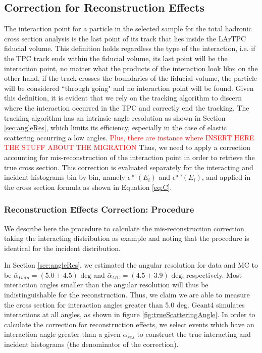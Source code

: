 \subsection{Correction for Reconstruction Effects}\label{ch:EFFXS}
The interaction point for a particle in the selected sample for the total hadronic cross section analysis is the last point of its track that lies inside the LArTPC fiducial volume. This definition holds regardless the type of the interaction, i.e. if the TPC track ends within the fiducial volume, its last point will be the interaction point, no matter what the products of the interaction look like; on the other hand, if the track crosses the boundaries of the fiducial volume, the particle will be considered ``through going" and no interaction point will be found.  Given this definition, it is evident that we rely on the tracking algorithm to discern where the interaction occurred in the TPC  and correctly end the tracking. The tracking algorithm has an intrinsic angle resolution as shown in Section \ref{sec:angleRes}, which limits its efficiency, especially in the case of elastic scattering occurring a low angles. \textcolor{red}{Plus, there are instance where INSERT HERE THE STUFF ABOUT THE MIGRATION}
Thus, we need to apply a correction accounting for mis-reconstruction of the interaction point in order to retrieve the true cross section.  This correction is evaluated separately for the interacting and incident histograms bin by bin, namely $\epsilon^{\text{int}}(E_i)$ and  $\epsilon^{\text{inc}}(E_i)$, and applied in the cross section formula as shown in  Equation \ref{eq:C}. 

\subsubsection{Reconstruction Effects Correction: Procedure}\label{sec:EffCorrection}
We describe here the procedure to calculate the mis-reconstruction correction taking the interacting distribution as example and noting that the procedure is identical for the incident distribution. 

In Section \ref{sec:angleRes}, we estimated the angular resolution for data and MC to be $\bar\alpha_{Data} = (5.0 \pm 4.5) \text{ deg}$  and 
$\bar\alpha_{MC} = (4.5 \pm 3.9) \text{ deg}$, respectively.  Most interaction angles smaller than the angular resolution will thus be indistinguishable  for the reconstruction. Thus, we claim we are able to  measure the cross section for interaction angles greater than 5.0 deg. Geant4 simulates interactions at all angles, as shown in figure \ref{fig:trueScatteringAngle}. In order to calculate the correction for reconstruction effects,  we select events which have an interaction angle greater than a given $\alpha_{res}$ to construct the true interacting and incident histograms (the denominator of the correction).

